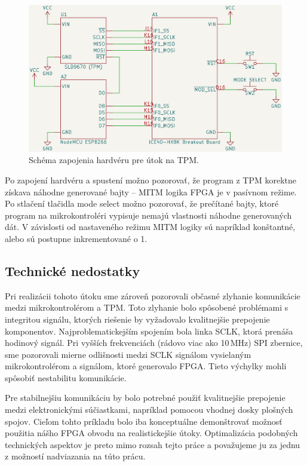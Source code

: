 \begin{figure}
    \centerline{\includegraphics[width=1\textwidth]{images/schematics/schemeTpmMitm.png}}
    \caption[Schéma zapojenia hardvéru pre útok na TPM]{Schéma zapojenia hardvéru pre útok na TPM.}
    \label{obr:schemeTpmMitm}
\end{figure}

Po zapojení hardvéru a spustení možno pozorovať, že program z TPM korektne získava náhodne generované bajty -- MITM logika FPGA je v pasívnom režime. Po stlačení tlačidla mode select možno pozorovať, že prečítané  bajty, ktoré program na mikrokontroléri vypisuje nemajú vlastnosti náhodne generovaných dát. V závislosti od nastaveného režimu MITM logiky sú napríklad konštantné, alebo sú postupne inkrementované o 1.

\subsection{Technické nedostatky}
Pri realizácii tohoto útoku sme zároveň pozorovali občasné zlyhanie komunikácie medzi mikrokontrolérom a TPM. Toto zlyhanie bolo spôsobené problémami s integritou signálu, ktorých riešenie by vyžadovalo kvalitnejšie prepojenie komponentov. Najproblematickejším spojením bola linka SCLK, ktorá prenáša hodinový signál. Pri vyšších frekvenciách (rádovo viac ako 10\,MHz) SPI zbernice, sme pozorovali mierne odlišnosti medzi SCLK signálom vysielaným mikrokontrolérom a signálom, ktoré generovalo FPGA. Tieto výchylky mohli spôsobiť nestabilitu komunikácie. 

Pre stabilnejšiu komunikáciu by bolo potrebné použiť kvalitnejšie prepojenie medzi elektronickými súčiastkami, napríklad pomocou vhodnej dosky plošných spojov. Cieľom tohto príkladu bolo iba konceptuálne demonštrovať možnosť použitia nášho FPGA obvodu na realistickejšie útoky. Optimalizácia podobných technických aspektov je preto mimo rozsah tejto práce a považujeme ju za jednu z možností nadviazania na túto prácu.